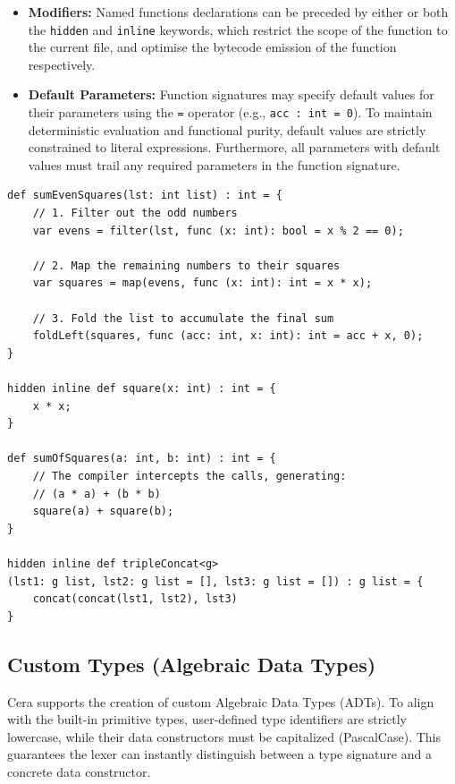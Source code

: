 \documentclass[11pt, a4paper]{article}
\begin{document}
\begin{itemize}
    \item \textbf{Modifiers:} Named functions declarations can be preceded by either or both the \texttt{hidden} and \texttt{inline} keywords, which restrict the scope of the function to the current file, and optimise the bytecode emission of the function respectively. 
    \item \textbf{Default Parameters:} Function signatures may specify default values for their parameters using the \texttt{=} operator (e.g., \texttt{acc : int = 0}). To maintain deterministic evaluation and functional purity, default values are strictly constrained to literal expressions. Furthermore, all parameters with default values must trail any required parameters in the function signature.
\end{itemize}

\begin{lstlisting}[language=Cera, title={Higher-Order Data Pipelines \& Modifiers}, basicstyle=\ttfamily]
def sumEvenSquares(lst: int list) : int = {
    // 1. Filter out the odd numbers
    var evens = filter(lst, func (x: int): bool = x % 2 == 0);
    
    // 2. Map the remaining numbers to their squares
    var squares = map(evens, func (x: int): int = x * x);
    
    // 3. Fold the list to accumulate the final sum
    foldLeft(squares, func (acc: int, x: int): int = acc + x, 0);
}

hidden inline def square(x: int) : int = {
    x * x;
}

def sumOfSquares(a: int, b: int) : int = {
    // The compiler intercepts the calls, generating:
    // (a * a) + (b * b)
    square(a) + square(b);
}

hidden inline def tripleConcat<g>
(lst1: g list, lst2: g list = [], lst3: g list = []) : g list = {
    concat(concat(lst1, lst2), lst3)
}
\end{lstlisting}

\subsection{Custom Types (Algebraic Data Types)}
\noindent
Cera supports the creation of custom Algebraic Data Types (ADTs). To align with the built-in primitive types, user-defined type identifiers are strictly lowercase, while their data constructors must be capitalized (PascalCase). This guarantees the lexer can instantly distinguish between a type signature and a concrete data constructor.
\end{document}
